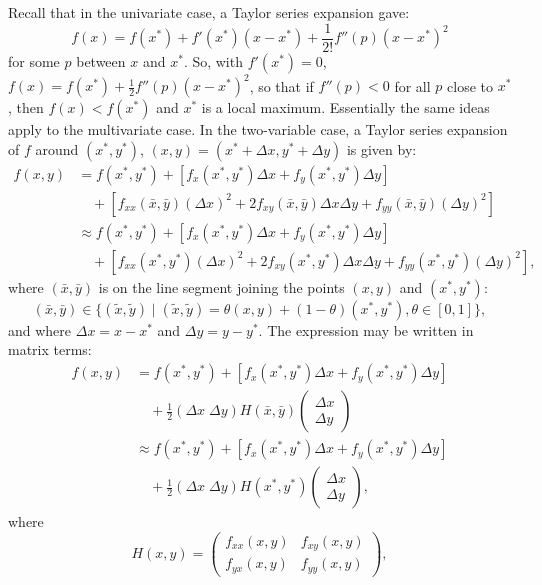 \begin{original}
Recall that in the univariate case, a Taylor series expansion gave:
\[
f(x) = f(x^*) + f'(x^*)(x - x^*) + \frac{1}{2!}f''(p)(x - x^*)^2
\]
for some $p$ between $x$ and $x^*$. So, with $f'(x^*) = 0$, $f(x) = f(x^*) + \frac{1}{2}f''(p)(x-x^*)^2$, so that if $f''(p) < 0$ for all $p$ close to $x^*$, then $f(x) < f(x^*)$ and $x^*$ is a local maximum. Essentially the same ideas apply to the multivariate case. In the two-variable case, a Taylor series expansion of $f$ around $(x^*, y^*)$, $(x, y) = (x^* + \Delta x, y^* + \Delta y)$ is given by:
\begin{align}
f(x, y) &= f(x^*, y^*) + [f_x(x^*, y^*)\Delta x + f_y(x^*, y^*)\Delta y] \tag{11.2}\\
&\quad + [f_{xx}(\bar{x}, \bar{y})(\Delta x)^2 + 2f_{xy}(\bar{x}, \bar{y})\Delta x\Delta y + f_{yy}(\bar{x}, \bar{y})(\Delta y)^2] \tag{11.3}\\
&\approx f(x^*, y^*) + [f_x(x^*, y^*)\Delta x + f_y(x^*, y^*)\Delta y] \nonumber\\
&\quad + [f_{xx}(x^*, y^*)(\Delta x)^2 + 2f_{xy}(x^*, y^*)\Delta x\Delta y + f_{yy}(x^*, y^*)(\Delta y)^2], \nonumber
\end{align}
where $(\bar{x}, \bar{y})$ is on the line segment joining the points $(x, y)$ and $(x^*, y^*)$:
\[
(\bar{x}, \bar{y}) \in \{(\tilde{x}, \tilde{y}) \mid (\tilde{x}, \tilde{y}) = \theta(x, y) + (1-\theta)(x^*, y^*), \theta \in [0,1]\},
\]
and where $\Delta x = x - x^*$ and $\Delta y = y - y^*$. The expression may be written in matrix terms:
\begin{align}
f(x, y) &= f(x^*, y^*) + [f_x(x^*, y^*)\Delta x + f_y(x^*, y^*)\Delta y] \tag{11.4}\\
&\quad + \frac{1}{2}(\Delta x\; \Delta y) H(\bar{x}, \bar{y}) \begin{pmatrix} \Delta x \\ \Delta y \end{pmatrix} \tag{11.5}\\
&\approx f(x^*, y^*) + [f_x(x^*, y^*)\Delta x + f_y(x^*, y^*)\Delta y] \nonumber\\
&\quad + \frac{1}{2}(\Delta x\; \Delta y) H(x^*, y^*) \begin{pmatrix} \Delta x \\ \Delta y \end{pmatrix}, \nonumber
\end{align}
where
\[
H(x, y) = \begin{pmatrix} f_{xx}(x, y) & f_{xy}(x, y) \\ f_{yx}(x, y) & f_{yy}(x, y) \end{pmatrix},
\]
\end{original}
